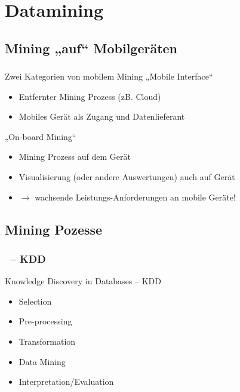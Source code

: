 \section{Datamining}

\subsection{Mining „auf“ Mobilgeräten}

\begin{frame}
    \frametitle{\insertsubsection}
    \begin{block}{Zwei Kategorien von mobilem Mining \cite{pocket2014}}
        \vspace{1em}
        „Mobile Interface“
        \vspace{0.6em}
        \begin{itemize}
            \setlength\itemsep{0.6em}
            \item Entfernter Mining Prozess (zB. Cloud)
            \item Mobiles Gerät als Zugang und Datenlieferant
        \end{itemize}
        \vspace{0.8em}
        „On-board Mining“
        \vspace{0.6em}
        \begin{itemize}
            \setlength\itemsep{0.6em}
            \item Mining Prozess auf dem Gerät
            \item Visualisierung (oder andere Auswertungen) auch auf Gerät
            \item $\rightarrow$ wachsende Leistungs-Anforderungen an mobile Geräte!
        \end{itemize}
    \end{block}
\end{frame}

\subsection{Mining Pozesse}

\begin{frame}
    \frametitle{\insertsubsection \ -- KDD}
    \begin{block}{Knowledge Discovery in Databases -- KDD \cite{kdd96}}
        \vspace{0.5em}
        \begin{itemize}
            \setlength\itemsep{1em}
            \item Selection
            \item Pre-processing
            \item Transformation
            \item Data Mining
            \item Interpretation/Evaluation
        \end{itemize}
    \end{block}
\end{frame}

